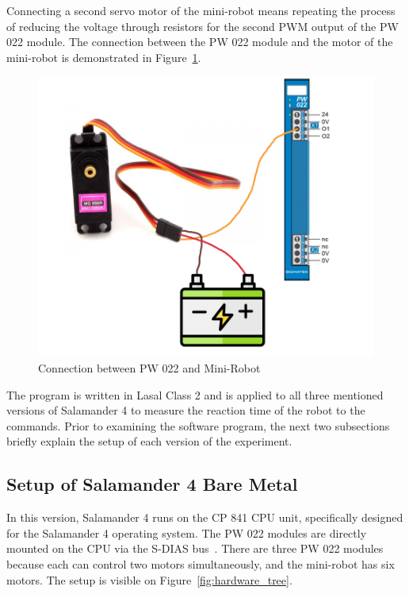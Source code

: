 \documentclass[MMR,Master,english]{style/twbook}
\begin{document}
\noindent Connecting a second servo motor of the mini-robot means repeating the process of reducing the voltage through resistors for the second PWM output of the PW 022 module. The connection between the PW 022 module and the motor of the mini-robot is demonstrated in Figure~\ref{fig:pw022_minirobot_connection}.

\begin{figure}[H]
	\centering
	\includegraphics[width=0.7\columnwidth]{img/experiment/pw022_minirobot.png}
	\caption[Connection between PW 022 and Mini-Robot]{Connection between PW 022 and Mini-Robot~\cite{MG996RDigitalServo}}
	\label{fig:pw022_minirobot_connection}
\end{figure}

\noindent The program is written in Lasal Class 2 and is applied to all three mentioned versions of Salamander 4 to measure the reaction time of the robot to the commands. Prior to examining the software program, the next two subsections briefly explain the setup of each version of the experiment.

\subsection{Setup of Salamander 4 Bare Metal}
In this version, Salamander 4 runs on the CP 841 CPU unit, specifically designed for the Salamander 4 operating system. The PW 022 modules are directly mounted on the CPU via the S-DIAS bus~\cite{SDIASSIGMATEK}. There are three PW 022 modules because each can control two motors simultaneously, and the mini-robot has six motors. The setup is visible on Figure~\ref{fig:hardware_tree}.
\end{document}
